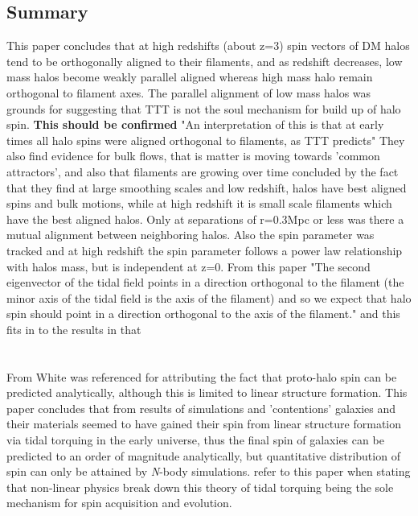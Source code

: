 \documentclass[fleqn,usenatbib]{mnras}
\begin{document}
\subsection{Summary}
This paper concludes that at high redshifts (about z=3) spin vectors of DM halos tend to be orthogonally aligned to their filaments, and as redshift decreases, low mass halos become weakly parallel aligned whereas high mass halo remain orthogonal to filament axes. The parallel alignment of low mass halos was grounds for suggesting that TTT is not the soul mechanism for build up of halo spin.
\textbf{This should be confirmed} "An interpretation of this is that at early times all halo
spins were aligned orthogonal to filaments, as TTT predicts"
They also find evidence for bulk flows, that is matter is moving towards 'common attractors', and also that filaments are growing over time concluded by the fact that they find at large smoothing scales and low redshift, halos have best aligned spins and bulk motions, while at high redshift it is small scale filaments which have the best aligned halos.
Only at separations of r=0.3Mpc or less was there a mutual alignment between neighboring halos. Also the spin parameter was tracked and at high redshift the spin parameter follows a power law relationship with halos mass, but is independent at z=0. 
From this paper "The second eigenvector of the tidal field points in a direction orthogonal to the filament (the minor axis of the tidal field is the axis of the filament) and so we expect that halo spin should point in a direction orthogonal to the axis of the filament." and this fits in to the results in that


\section{\citet{White84}}
From \citet{Trowland_13} White was referenced for attributing the fact that proto-halo spin can be predicted analytically, although this is limited to linear structure formation.
This paper concludes that from results of simulations and 'contentions' galaxies and their materials seemed to have gained their spin from linear structure formation via tidal torquing in the early universe, thus the final spin of galaxies can be predicted to an order of magnitude analytically, but quantitative distribution of spin can only be attained by \textit{N}-body simulations. \citet{Bett_Frenk_12} refer to this paper when stating that non-linear physics break down this theory of tidal torquing being the sole mechanism for spin acquisition and evolution.
\end{document}
